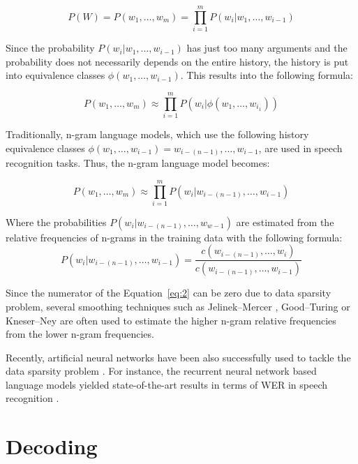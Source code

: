 \begin{equation}
  P(W) = P(w_1,\dots,w_m) = \prod\limits_{i=1}^{m} P(w_i|w_1,\dots,w_{i-1})
\end{equation}

Since the probability $P(w_i|w_1,\dots,w_{i-1})$ has just too many arguments
  and the probability does not necessarily depends on the entire history,
  the history is put into equivalence classes $\phi(w_1,\dots,w_{i-1})$.
This results into the following formula:

\begin{equation}
  P(w_1,\dots,w_m) \approx \prod\limits_{i=1}^{m} P(w_i|\phi(w_1,\dots,w_{i_1}))
\end{equation}

Traditionally, n-gram language models,
  which use the following history equivalence classes $\phi(w_1,\dots,w_{i-1}) = w_{i-(n-1)},\dots,w_{i-1}$,
  are used in speech recognition tasks.
Thus, the n-gram language model becomes:

\begin{equation}
  P(w_1,\dots,w_m) \approx \prod\limits_{i=1}^{m} P(w_i|w_{i-(n-1)},\dots,w_{i-1})
\end{equation}

Where the probabilities $P(w_i|w_{i-(n-1)},\dots,w_{w-1})$ are estimated from the relative frequencies of n-grams in the training data with the following formula:
\begin{equation}
  \label{eq:2}
  P(w_i|w_{i-(n-1)},\dots,w_{i-1}) = \frac{c(w_{i-(n-1)},\dots,w_i)}{c(w_{i-(n-1)},\dots,w_{i-1})}
\end{equation}


Since the numerator of the Equation~\ref{eq:2} can be zero due to data sparsity problem,
  several smoothing techniques such as
  Jelinek--Mercer \cite{jelinek1980interpolated},
  Good--Turing \cite{gale1995good}
  or Kneser--Ney \cite{kneser1995improved} are often used to estimate the higher n-gram relative frequencies from the lower n-gram frequencies.

Recently, artificial neural networks have been also successfully used to tackle the data sparsity problem \cite{bengio2003neural}.
For instance, the recurrent neural network based language models yielded state-of-the-art results in terms of WER in speech recognition \cite{mikolov2010recurrent}.


\section{Decoding}
\BLIND


